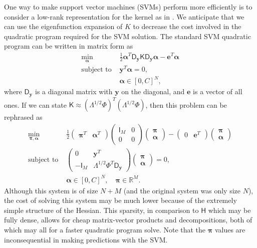 \documentclass[11pt]{NSFamsart}
\def\reals{{\mathbb{R}}}
\newcommand{\mD}{\mathsf{D}}
\newcommand{\mH}{\mathsf{H}}
\newcommand{\mI}{\mathsf{I}}
\newcommand{\mK}{\mathsf{K}}
\newcommand{\mPhi}{\mathsf{\Phi}}
\newcommand{\mLambda}{\mathsf{\Lambda}}
\newcommand{\be}{{\boldsymbol{e}}}
\newcommand{\by}{{\boldsymbol{y}}}
\newcommand{\bpi}{{\boldsymbol{\pi}}}
\newcommand{\balpha}{{\boldsymbol{\alpha}}}
\begin{document}
One way to make support vector machines (SVMs) perform more efficiently is to consider a low-rank representation for the kernel as in \citep{FineScheinberg02}. We anticipate that we can use the eigenfunction expansion of $K$ to decrease the cost involved in the quadratic program required for the SVM solution. The standard SVM quadratic program can be written in matrix form as
\begin{align}
    \min_{\balpha} \;&
        \frac{1}{2}\balpha^T\mD_{\by}\mK\mD_{\by}\balpha - \be^T\balpha \\
    \text{subject to } & \by^T\balpha = 0, \nonumber\\
    & \balpha\in[0,C]^N, \nonumber
\end{align}
where $\mD_{\by}$ is a diagonal matrix with $\by$ on the diagonal,
and $\be$ is a vector of all ones.  If we can state
$\mK\approx(\mLambda^{1/2}\mPhi)^T(\mLambda^{1/2}\mPhi)$, then this
problem can be rephrased \citep{FineScheinberg02} as
\begin{align*}
    \min_{\bpi,\balpha} \;&
        \frac{1}{2}\begin{pmatrix}\bpi^T&\balpha^T\end{pmatrix}
        \begin{pmatrix}\mI_M&0\\0&0\end{pmatrix}
        \begin{pmatrix}\bpi\\\balpha\end{pmatrix}
        - \begin{pmatrix}0&\be^T\end{pmatrix}\begin{pmatrix}\bpi\\\balpha\end{pmatrix} \\
    \text{subject to } &
        \begin{pmatrix}0&\by^T\\-\mI_M&\mLambda^{1/2}\mPhi^T\mD_{\by}\end{pmatrix}
        \begin{pmatrix}\bpi\\\balpha\end{pmatrix} = 0, \nonumber\\
    & \balpha\in[0,C]^N,\quad \bpi\in\reals^M. \nonumber
\end{align*}
Although
this system is of size $N+M$ (and the original system was only size $N$), the
cost of solving this system may be much lower because of the extremely simple
structure of the Hessian.  This sparsity, in comparison to $\mH$ which may be
fully dense, allows for cheap matrix-vector products and decompositions, both
of which may all for a faster quadratic program solve.  Note that the $\bpi$
values are inconsequential in making predictions with the SVM.
\end{document}
